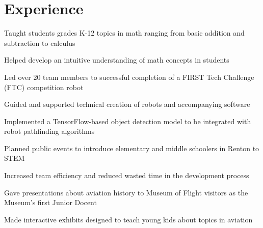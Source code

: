 \documentclass[]{deedy-resume}
\begin{document}
\hfill
\begin{minipage}[t]{0.66\textwidth} 


\section{Experience}
\vspace{\topsep} %
\begin{tightemize}
\item Taught students grades K-12 topics in math ranging from basic addition and subtraction to calculus
\item Helped develop an intuitive understanding of math concepts in students
\end{tightemize}
\sectionsep

\begin{tightemize}
\item Led over 20 team members to successful completion of a FIRST Tech Challenge (FTC) competition robot
\item Guided and supported technical creation of robots and accompanying software
\item Implemented a TensorFlow-based object detection model to be integrated with robot pathfinding algorithms
\item Planned public events to introduce elementary and middle schoolers in Renton to STEM
\item Increased team efficiency and reduced wasted time in the development process
\end{tightemize}
\sectionsep

\begin{tightemize}
\item Gave presentations about aviation history to Museum of Flight visitors as the Museum's first Junior Docent
\item Made interactive exhibits designed to teach young kids about topics in aviation
\end{tightemize}
\sectionsep


\end{minipage}
\end{document}
